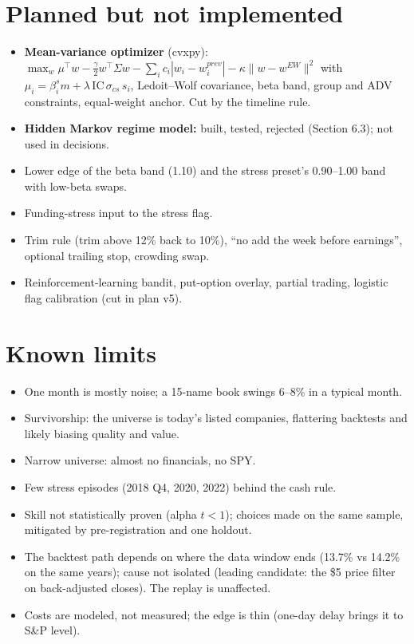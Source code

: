 \documentclass[11pt]{article}
\begin{document}
\section{Planned but not implemented}
\begin{itemize}
\item \textbf{Mean-variance optimizer} (cvxpy): $\max_w \mu^\top w - \tfrac{\gamma}{2}w^\top\Sigma w - \sum_i c_i|w_i-w_i^{prev}| - \kappa\|w-w^{EW}\|^2$ with $\mu_i=\beta^s_i m + \lambda\,\text{IC}\,\sigma_{cs}\,s_i$, Ledoit--Wolf covariance, beta band, group and ADV constraints, equal-weight anchor. Cut by the timeline rule.
\item \textbf{Hidden Markov regime model:} built, tested, rejected (Section 6.3); not used in decisions.
\item Lower edge of the beta band (1.10) and the stress preset's 0.90--1.00 band with low-beta swaps.
\item Funding-stress input to the stress flag.
\item Trim rule (trim above 12\% back to 10\%), ``no add the week before earnings'', optional trailing stop, crowding swap.
\item Reinforcement-learning bandit, put-option overlay, partial trading, logistic flag calibration (cut in plan v5).
\end{itemize}

\section{Known limits}
\begin{itemize}
\item One month is mostly noise; a 15-name book swings 6--8\% in a typical month.
\item Survivorship: the universe is today's listed companies, flattering backtests and likely biasing quality and value.
\item Narrow universe: almost no financials, no SPY.
\item Few stress episodes (2018 Q4, 2020, 2022) behind the cash rule.
\item Skill not statistically proven (alpha $t<1$); choices made on the same sample, mitigated by pre-registration and one holdout.
\item The backtest path depends on where the data window ends (13.7\% vs 14.2\% on the same years); cause not isolated (leading candidate: the \$5 price filter on back-adjusted closes). The replay is unaffected.
\item Costs are modeled, not measured; the edge is thin (one-day delay brings it to S\&P level).
\end{itemize}
\end{document}
